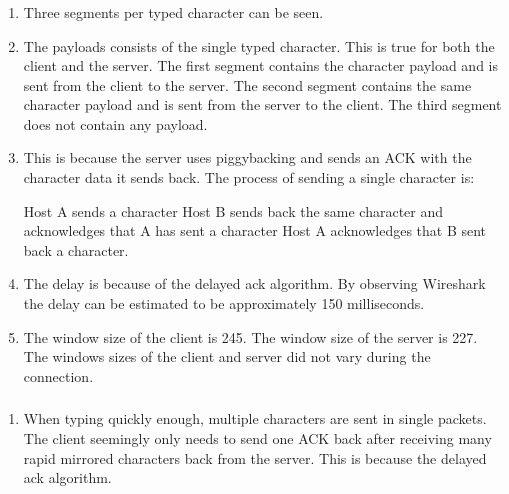 \documentclass[a4paper]{article}
\begin{document}
\subsubsection{}
\begin{enumerate}[label=\alph*)]
\item Three segments per typed character can be seen. 
\item The payloads consists of the single typed character. This is true for both the client and the server. The first segment contains the character payload and is sent from the client to the server. The second segment contains the same character payload and is sent from the server to the client. The third segment does not contain any payload.
\item This is because the server uses piggybacking and sends an ACK with the character data it sends back.
\newline
\newline
The process of sending a single character is:

Host A sends a character
Host B sends back the same character and acknowledges that A has sent a character
Host A acknowledges that B sent back a character.

\item The delay is because of the delayed ack algorithm. By observing Wireshark the delay can be estimated to be approximately 150 milliseconds.
\item The window size of the client is 245.\newline
The window size of the server is 227.\newline
\newline
The windows sizes of the client and server did not vary during the connection.

\end{enumerate}
\subsubsection{}
\begin{enumerate}[label=\alph*)]
\item When typing quickly enough, multiple characters are sent in single packets. The client seemingly only needs to send one ACK back after receiving many rapid mirrored characters back from the server. This is because the delayed ack algorithm.
\end{enumerate}
\setcounter{subsection}{2}
\setcounter{subsubsection}{4}
\end{document}
